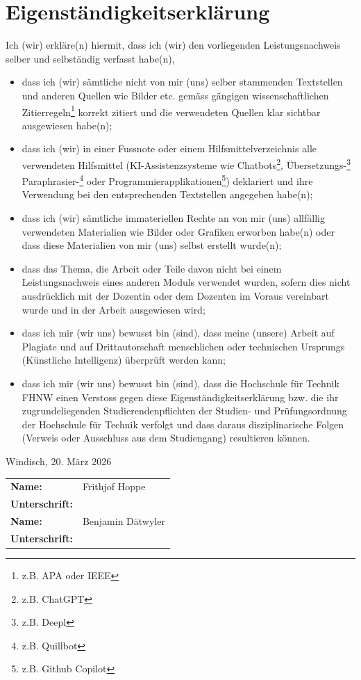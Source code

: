\section*{Eigenständigkeitserklärung}


Ich (wir) erkläre(n) hiermit, dass ich (wir) den vorliegenden Leistungsnachweis selber und selbständig verfasst habe(n),
\begin{itemize} 
\item dass ich (wir) sämtliche nicht von mir (uns) selber stammenden Textstellen und anderen Quellen wie Bilder etc. gemäss gängigen wissenschaftlichen Zitierregeln\footnote{z.B. APA oder IEEE} korrekt zitiert und die verwendeten Quellen klar sichtbar ausgewiesen habe(n); 
\item dass ich (wir) in einer Fussnote oder einem Hilfsmittelverzeichnis alle verwendeten Hilfsmittel (KI-Assistenzsysteme wie Chatbots\footnote{z.B. ChatGPT}, Übersetzungs-\footnote{z.B. Deepl} Paraphrasier-\footnote{z.B. Quillbot} oder Programmierapplikationen\footnote{z.B. Github Copilot}) deklariert und ihre Verwendung bei den entsprechenden Textstellen angegeben habe(n);
\item dass ich (wir) sämtliche immateriellen Rechte an von mir (uns) allfällig verwendeten Materialien wie Bilder oder Grafiken erworben habe(n) oder dass diese Materialien von mir (uns) selbst erstellt wurde(n);
\item dass das Thema, die Arbeit oder Teile davon nicht bei einem Leistungsnachweis eines anderen Moduls verwendet wurden, sofern dies nicht ausdrücklich mit der Dozentin oder dem Dozenten im Voraus vereinbart wurde und in der Arbeit ausgewiesen wird; 
\item dass ich mir (wir uns) bewusst bin (sind), dass meine (unsere) Arbeit auf Plagiate und auf Drittautorschaft menschlichen oder technischen Ursprungs (Künstliche Intelligenz) überprüft werden kann;
\item dass ich mir (wir uns) bewusst bin (sind), dass die Hochschule für Technik FHNW einen Verstoss gegen diese Eigenständigkeitserklärung bzw. die ihr zugrundeliegenden Studierendenpflichten der Studien- und Prüfungsordnung der Hochschule für Technik verfolgt und dass daraus disziplinarische Folgen (Verweis oder Ausschluss aus dem Studiengang) resultieren können.
\end{itemize}

\vspace*{4ex}

Windisch, 20. März 2026

\vspace*{4ex}

\renewcommand{\arraystretch}{2}
\begin{tabular}{@{}>{\bf}ll}
Name: & Frithjof Hoppe\\
Unterschrift: & \\[6ex]
Name: & Benjamin Dätwyler\\
Unterschrift: & \\
\end{tabular}
